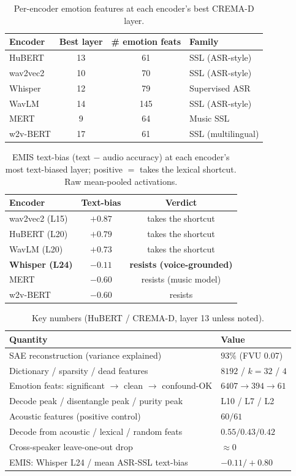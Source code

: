 \documentclass[sigconf,anonymous,nonacm]{acmart}
\begin{document}
\begin{table}[t]
\caption{Per-encoder emotion features at each encoder's best CREMA-D layer.}
\label{tab:encoders}\small
\begin{tabular}{lccl}
\toprule
Encoder & Best layer & \# emotion feats & Family \\ \midrule
HuBERT   & 13 & 61  & SSL (ASR-style) \\
wav2vec2 & 10 & 70  & SSL (ASR-style) \\
Whisper  & 12 & 79  & Supervised ASR \\
WavLM    & 14 & 145 & SSL (ASR-style) \\
MERT     &  9 & 64  & Music SSL \\
w2v-BERT & 17 & 61  & SSL (multilingual) \\
\bottomrule
\end{tabular}
\end{table}

\begin{table}[t]
\caption{EMIS text-bias (text $-$ audio accuracy) at each encoder's most text-biased layer; positive $=$ takes the lexical shortcut. Raw mean-pooled activations.}
\label{tab:emis}\small
\begin{tabular}{lcc}
\toprule
Encoder & Text-bias & Verdict \\ \midrule
wav2vec2 (L15) & $+0.87$ & takes the shortcut \\
HuBERT (L20)   & $+0.79$ & takes the shortcut \\
WavLM (L20)    & $+0.73$ & takes the shortcut \\
\textbf{Whisper (L24)} & $\mathbf{-0.11}$ & \textbf{resists (voice-grounded)} \\
MERT           & $-0.60$ & resists (music model) \\
w2v-BERT       & $-0.60$ & resists \\
\bottomrule
\end{tabular}
\end{table}

\begin{table}[t]
\caption{Key numbers (HuBERT / CREMA-D, layer 13 unless noted).}
\label{tab:key}\small
\begin{tabular}{ll}
\toprule Quantity & Value \\ \midrule
SAE reconstruction (variance explained) & $93\%$ (FVU 0.07) \\
Dictionary / sparsity / dead features & $8192$ / $k{=}32$ / $4$ \\
Emotion feats: significant $\to$ clean $\to$ confound-OK & $6407 \to 394 \to 61$ \\
Decode peak / disentangle peak / purity peak & L10 / L7 / L2 \\
Acoustic features (positive control) & $60/61$ \\
Decode from acoustic / lexical / random feats & $0.55 / 0.43 / 0.42$ \\
Cross-speaker leave-one-out drop & $\approx 0$ \\
EMIS: Whisper L24 / mean ASR-SSL text-bias & $-0.11 / +0.80$ \\
\bottomrule
\end{tabular}
\end{table}
\end{document}

